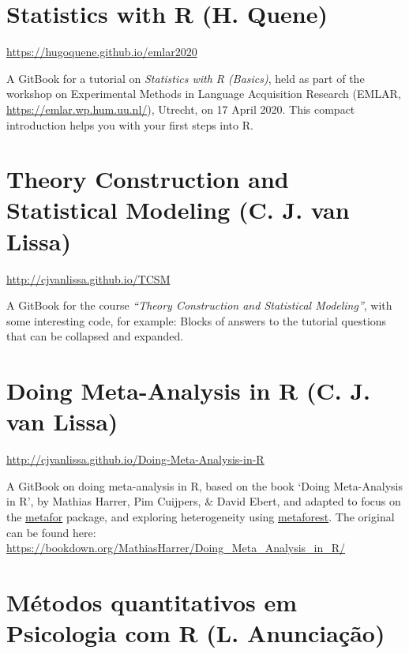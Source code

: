 \documentclass[
]{book}
\begin{document}
\hypertarget{statistics-with-r-h.-quene}{%
\section{Statistics with R (H. Quene)}\label{statistics-with-r-h.-quene}}

\url{https://hugoquene.github.io/emlar2020}

A GitBook for a tutorial on \emph{Statistics with R (Basics)}, held as part of the workshop on Experimental Methods in Language Acquisition Research (EMLAR, \url{https://emlar.wp.hum.uu.nl/}), Utrecht, on 17 April 2020. This compact introduction helps you with your first steps into R.

\hypertarget{theory-construction-and-statistical-modeling-c.-j.-van-lissa}{%
\section{Theory Construction and Statistical Modeling (C. J. van Lissa)}\label{theory-construction-and-statistical-modeling-c.-j.-van-lissa}}

\url{http://cjvanlissa.github.io/TCSM}

A GitBook for the course \emph{``Theory Construction and Statistical Modeling''}, with some interesting code, for example: Blocks of answers to the tutorial questions that can be collapsed and expanded.

\hypertarget{doing-meta-analysis-in-r-c.-j.-van-lissa}{%
\section{Doing Meta-Analysis in R (C. J. van Lissa)}\label{doing-meta-analysis-in-r-c.-j.-van-lissa}}

\url{http://cjvanlissa.github.io/Doing-Meta-Analysis-in-R}

A GitBook on doing meta-analysis in R, based on the book `Doing Meta-Analysis in R', by Mathias Harrer, Pim Cuijpers, \& David Ebert, and adapted to focus on the \href{https://cran.r-project.org/web/packages/metafor/index.html}{metafor} package, and exploring heterogeneity using \href{https://cran.r-project.org/web/packages/metaforest/index.html}{metaforest}. The original can be found here: \url{https://bookdown.org/MathiasHarrer/Doing_Meta_Analysis_in_R/}

\hypertarget{muxe9todos-quantitativos-em-psicologia-com-r-l.-anunciauxe7uxe3o}{%
\section{Métodos quantitativos em Psicologia com R (L. Anunciação)}\label{muxe9todos-quantitativos-em-psicologia-com-r-l.-anunciauxe7uxe3o}}
\end{document}
